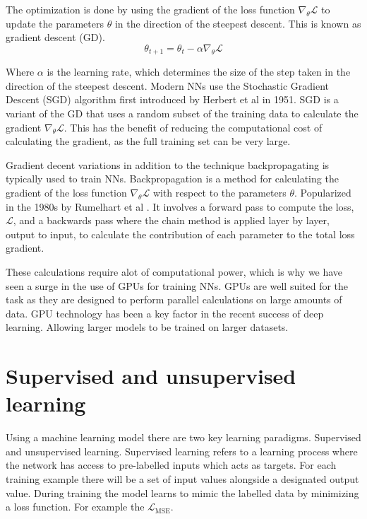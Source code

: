 The optimization is done by using the gradient of the loss function $\nabla_\theta \mathcal{L}$ to update the parameters $\theta$ in the direction of the steepest descent. This is known as gradient descent (GD).
\begin{equation}
    \theta_{t+1} = \theta_t - \alpha \nabla_\theta \mathcal{L}
\end{equation}

Where $\alpha$ is the learning rate, which determines the size of the step taken in the direction of the steepest descent. Modern NNs use the Stochastic Gradient Descent (SGD) algorithm first introduced by Herbert et al \cite{SGD} in 1951.
SGD is a variant of the GD that uses a random subset of the training data to calculate the gradient $\nabla_\theta \mathcal{L}$. This has the benefit of reducing the computational cost of calculating the gradient, as the full training set can be very large.

Gradient decent variations in addition to the technique backpropagating is typically used to train NNs. Backpropagation is a method for calculating the gradient of the loss function $\nabla_\theta \mathcal{L}$ with respect to the parameters $\theta$. Popularized in the 1980s by Rumelhart et al \cite{backprop2}.
It involves a forward pass to compute the loss, $\mathcal{L}$, and a backwards pass where the chain method is applied layer by layer, output to input, to calculate the contribution of each parameter to the total loss gradient.

These calculations require alot of computational power, which is why we have seen a surge in the use of GPUs for training NNs. GPUs are well suited for the task as they are designed to perform parallel calculations on large amounts of data. GPU technology has been a key factor in the recent success of deep learning.
Allowing larger models to be trained on larger datasets.

\section{Supervised and unsupervised learning}
Using a machine learning model there are two key learning paradigms. Supervised and unsupervised learning. Supervised learning refers to a learning process where the network has access to pre-labelled inputs which acts as targets.
For each training example there will be a set of input values alongside a designated output value. During training the model learns to mimic the labelled data by minimizing a loss function. For example the $\mathcal{L}_\text{MSE}$.

